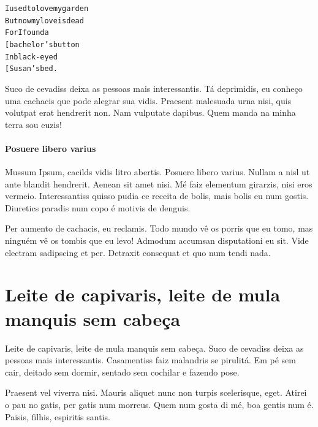 \begin{alltt}\normalfont			%
I used to love my garden
But now my love is dead
   For I found a 
   			      		[ bachelor’s button
   In black-eyed 
              	        [ Susan’s bed.
\end{alltt}

Suco de cevadiss deixa as pessoas mais interessantis. Tá deprimidis, eu conheço
uma cachacis que pode alegrar sua vidis. Praesent malesuada urna nisi, quis
volutpat erat hendrerit non. Nam vulputate dapibus. Quem manda na minha terra
sou euzis!

\subsubsection{Posuere libero varius}

Mussum Ipsum, cacilds vidis litro abertis. Posuere libero varius. Nullam a nisl
ut ante blandit hendrerit. Aenean sit amet nisi. Mé faiz elementum girarzis,
nisi eros vermeio. Interessantiss quisso pudia ce receita de bolis, mais bolis
eu num gostis. Diuretics paradis num copo é motivis de denguis.

Per aumento de cachacis, eu reclamis. Todo mundo vê os porris que eu tomo, mas
ninguém vê os tombis que eu levo! Admodum accumsan disputationi eu sit. Vide
electram sadipscing et per. Detraxit consequat et quo num tendi nada.

\chapter{Leite de capivaris, leite de mula manquis sem cabeça}

Leite de capivaris, leite de mula manquis sem cabeça. Suco de cevadiss deixa as
pessoas mais interessantis. Casamentiss faiz malandris se pirulitá. Em pé sem
cair, deitado sem dormir, sentado sem cochilar e fazendo pose.

Praesent vel viverra nisi. Mauris aliquet nunc non turpis scelerisque, eget.
Atirei o pau no gatis, per gatis num morreus. Quem num gosta di mé, boa gentis
num é. Paisis, filhis, espiritis santis.

